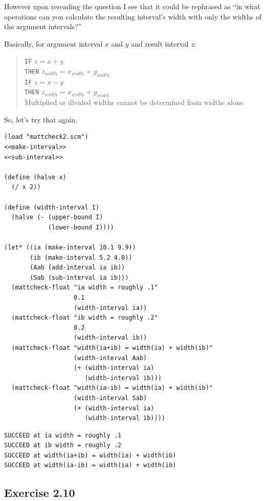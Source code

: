 \documentclass[final,fleqn,titlepage,twoside]{article}
\begin{document}
However upon rereading the question I see that it could be rephrased as ``in what
operations can you calculate the resulting interval's width with only the widths
of the argument intervals?''

Basically, for argument interval \(x\) and \(y\) and result interval \(z\):

\begin{quote}
\texttt{IF} \(z = x + y\) \\[0pt]
\texttt{THEN} \(z_{width} = x_{width} + y_{width}\) \\[0pt]
\texttt{IF} \(z = x - y\) \\[0pt]
\texttt{THEN} \(z_{width} = x_{width} + y_{width}\) \\[0pt]
Multiplied or divided widths cannot be determined from widths alone.
\end{quote}

So, let's try that again.

\begin{verbatim}
(load "mattcheck2.scm")
<<make-interval>>
<<sub-interval>>

(define (halve x)
  (/ x 2))

(define (width-interval I)
  (halve (- (upper-bound I)
            (lower-bound I))))

(let* ((ia (make-interval 10.1 9.9))
       (ib (make-interval 5.2 4.8))
       (Aab (add-interval ia ib))
       (Sab (sub-interval ia ib)))
  (mattcheck-float "ia width = roughly .1"
                   0.1
                   (width-interval ia))
  (mattcheck-float "ib width = roughly .2"
                   0.2
                   (width-interval ib))
  (mattcheck-float "width(ia+ib) = width(ia) + width(ib)"
                   (width-interval Aab)
                   (+ (width-interval ia)
                      (width-interval ib)))
  (mattcheck-float "width(ia-ib) = width(ia) + width(ib)"
                   (width-interval Sab)
                   (+ (width-interval ia)
                      (width-interval ib))))
\end{verbatim}

\begin{verbatim}
SUCCEED at ia width = roughly .1
SUCCEED at ib width = roughly .2
SUCCEED at width(ia+ib) = width(ia) + width(ib)
SUCCEED at width(ia-ib) = width(ia) + width(ib)
\end{verbatim}

\subsection{Exercise 2.10}
\label{sec:orgdd2933f}
\end{document}
